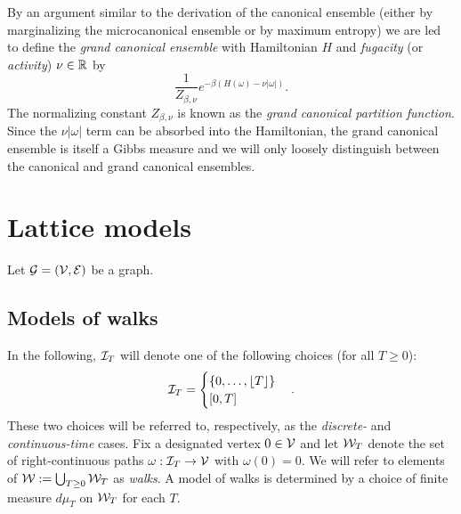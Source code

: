 By an argument similar to the derivation of the canonical ensemble (either by marginalizing
the microcanonical ensemble or by maximum entropy) we are led to define the \emph{grand
canonical ensemble} with Hamiltonian $H$ and \emph{fugacity} (or \emph{activity}) $\nu \in {\mathbb R}$ by
\begin{equation}
\frac{1}{Z_{\beta,\nu}} e^{-\beta (H(\omega) - \nu |\omega|)}.
\end{equation}
The normalizing constant $Z_{\beta,\nu}$ is known as the \emph{grand canonical partition function}.
Since the $\nu |\omega|$ term can be absorbed into the Hamiltonian,
the grand canonical ensemble is itself a Gibbs measure and we will only loosely
distinguish between the canonical and grand canonical ensembles. 


\section{Lattice models}

Let $\mathcal{G} = (\mathcal{V}, \mathcal{E})$ be a graph.



\subsection{Models of walks}

In the following, $\mathcal{I}_T$ will denote one of the following choices (for all $T \ge 0$):
\begin{equation}
\mathcal{I}_T
  =
\begin{cases}
\{ 0, \ldots, \lfloor T \rfloor \} \\
[0, T]
\end{cases}.
\end{equation}
These two choices will be referred to, respectively, as the \emph{discrete-} and
\emph{continuous-time} cases.
Fix a designated vertex $0 \in \mathcal{V}$ and
let $\mathcal{W}_T$ denote the set of
right-continuous paths $\omega : \mathcal{I}_T \rightarrow \mathcal{V}$ with $\omega(0) = 0$.
We will refer to elements of $\mathcal{W} := \bigcup_{T \geq 0} \mathcal{W}_T$ as \emph{walks}.
A model of walks is determined by a choice of finite measure $d\mu_T$ on
$\mathcal{W}_T$ for each $T$.

